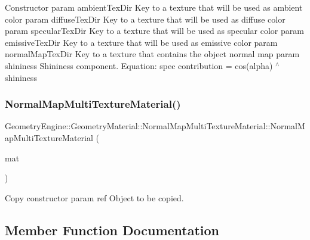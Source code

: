 Constructor param ambient\+Tex\+Dir Key to a texture that will be used as ambient color param diffuse\+Tex\+Dir Key to a texture that will be used as diffuse color param specular\+Tex\+Dir Key to a texture that will be used as specular color param emissive\+Tex\+Dir Key to a texture that will be used as emissive color param normal\+Map\+Tex\+Dir Key to a texture that contains the object normal map param shininess Shininess component. Equation\+: spec contribution = cos(alpha) $^\wedge$ shininess \mbox{\label{class_geometry_engine_1_1_geometry_material_1_1_normal_map_multi_texture_material_a4fbfa762312bb1ffdf00dd16262bb71c}} 
\subsubsection{\texorpdfstring{NormalMapMultiTextureMaterial()}{NormalMapMultiTextureMaterial()}\hspace{0.1cm}{\footnotesize\ttfamily [2/2]}}
{\footnotesize\ttfamily Geometry\+Engine\+::\+Geometry\+Material\+::\+Normal\+Map\+Multi\+Texture\+Material\+::\+Normal\+Map\+Multi\+Texture\+Material (\begin{DoxyParamCaption}\item[{const \mbox{\hyperlink{class_geometry_engine_1_1_geometry_material_1_1_normal_map_multi_texture_material}{Normal\+Map\+Multi\+Texture\+Material}} \&}]{mat }\end{DoxyParamCaption})}

Copy constructor param ref Object to be copied. 

\subsection{Member Function Documentation}
\mbox{\label{class_geometry_engine_1_1_geometry_material_1_1_normal_map_multi_texture_material_a38df455f7369f68ea2fc6abf31488c40}} 
